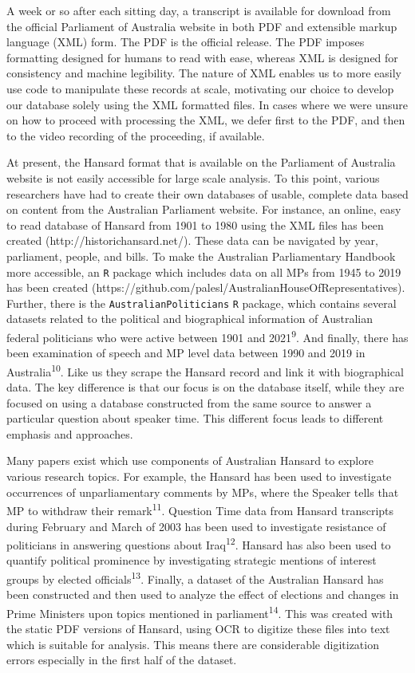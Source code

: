 \documentclass[
  letterpaper,
  DIV=11,
  numbers=noendperiod]{scrartcl}
\begin{document}
A week or so after each sitting day, a transcript is available for
download from the official Parliament of Australia website in both PDF
and extensible markup language (XML) form. The PDF is the official
release. The PDF imposes formatting designed for humans to read with
ease, whereas XML is designed for consistency and machine legibility.
The nature of XML enables us to more easily use code to manipulate these
records at scale, motivating our choice to develop our database solely
using the XML formatted files. In cases where we were unsure on how to
proceed with processing the XML, we defer first to the PDF, and then to
the video recording of the proceeding, if available.

At present, the Hansard format that is available on the Parliament of
Australia website is not easily accessible for large scale analysis. To
this point, various researchers have had to create their own databases
of usable, complete data based on content from the Australian Parliament
website. For instance, an online, easy to read database of Hansard from
1901 to 1980 using the XML files has been created
(http://historichansard.net/). These data can be navigated by year,
parliament, people, and bills. To make the Australian Parliamentary
Handbook more accessible, an \texttt{R} package which includes data on
all MPs from 1945 to 2019 has been created
(https://github.com/palesl/AustralianHouseOfRepresentatives). Further,
there is the \texttt{AustralianPoliticians} \texttt{R} package, which
contains several datasets related to the political and biographical
information of Australian federal politicians who were active between
1901 and 2021\textsuperscript{9}. And finally, there has been
examination of speech and MP level data between 1990 and 2019 in
Australia\textsuperscript{10}. Like us they scrape the Hansard record
and link it with biographical data. The key difference is that our focus
is on the database itself, while they are focused on using a database
constructed from the same source to answer a particular question about
speaker time. This different focus leads to different emphasis and
approaches.

Many papers exist which use components of Australian Hansard to explore
various research topics. For example, the Hansard has been used to
investigate occurrences of unparliamentary comments by MPs, where the
Speaker tells that MP to withdraw their remark\textsuperscript{11}.
Question Time data from Hansard transcripts during February and March of
2003 has been used to investigate resistance of politicians in answering
questions about Iraq\textsuperscript{12}. Hansard has also been used to
quantify political prominence by investigating strategic mentions of
interest groups by elected officials\textsuperscript{13}. Finally, a
dataset of the Australian Hansard has been constructed and then used to
analyze the effect of elections and changes in Prime Ministers upon
topics mentioned in parliament\textsuperscript{14}. This was created
with the static PDF versions of Hansard, using OCR to digitize these
files into text which is suitable for analysis. This means there are
considerable digitization errors especially in the first half of the
dataset.
\end{document}
